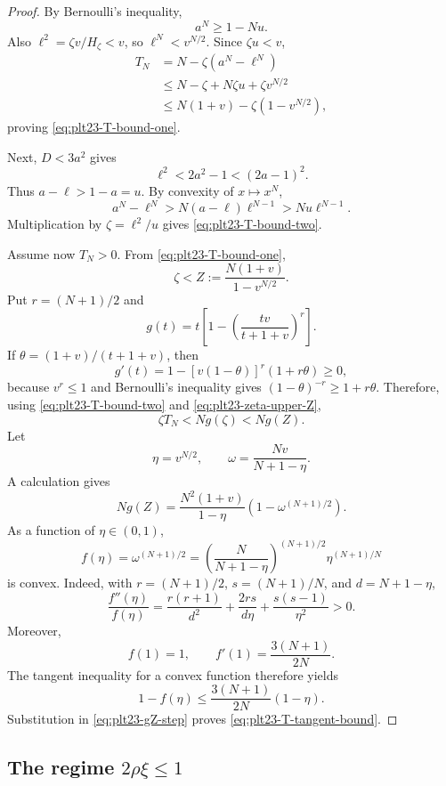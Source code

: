 \documentclass[11pt]{article}
\numberwithin{equation}{section}
\begin{document}
\begin{proof}
  By Bernoulli's inequality,
  \[
    a^N\ge1-Nu.
  \]
  Also $\ell^2=\zeta v/H_\zeta<v$, so $\ell^N<v^{N/2}$.
  Since $\zeta u< v$,
  \begin{align*}
    T_N
    &=N-\zeta(a^N-\ell^N)\\
    &\le N-\zeta+N\zeta u+\zeta v^{N/2}\\
    &\le N(1+v)-\zeta(1-v^{N/2}),
  \end{align*}
  proving \eqref{eq:plt23-T-bound-one}.

  Next, $D<3a^2$ gives
  \[
    \ell^2<2a^2-1<(2a-1)^2.
  \]
  Thus $a-\ell>1-a=u$.
  By convexity of $x\mapsto x^N$,
  \[
    a^N-\ell^N>N(a-\ell)\ell^{N-1}>Nu\ell^{N-1}.
  \]
  Multiplication by $\zeta=\ell^2/u$ gives \eqref{eq:plt23-T-bound-two}.

  Assume now $T_N>0$.
  From \eqref{eq:plt23-T-bound-one},
  \begin{equation}\label{eq:plt23-zeta-upper-Z}
    \zeta<Z:=\frac{N(1+v)}{1-v^{N/2}}.
  \end{equation}
  Put $r=(N+1)/2$ and
  \[
    g(t)=t\left[1-
    \left(\frac{tv}{t+1+v}\right)^r\right].
  \]
  If $\theta=(1+v)/(t+1+v)$, then
  \[
    g'(t)=1-[v(1-\theta)]^r(1+r\theta)\ge0,
  \]
  because $v^r\le1$ and Bernoulli's inequality gives $(1-\theta)^{-r}\ge1+r\theta$.
  Therefore, using \eqref{eq:plt23-T-bound-two} and \eqref{eq:plt23-zeta-upper-Z},
  \begin{equation}\label{eq:plt23-gZ-step}
    \zeta T_N<N g(\zeta)<Ng(Z).
  \end{equation}
  Let
  \[
    \eta=v^{N/2},
    \qquad
    \omega=\frac{Nv}{N+1-\eta}.
  \]
  A calculation gives
  \[
    Ng(Z)=
    \frac{N^2(1+v)}{1-\eta}
    \left(1-\omega^{(N+1)/2}\right).
  \]
  As a function of $\eta\in(0,1)$,
  \[
    f(\eta)=\omega^{(N+1)/2}
    =\left(\frac{N}{N+1-\eta}\right)^{(N+1)/2}
    \eta^{(N+1)/N}
  \]
  is convex.
  Indeed, with $r=(N+1)/2$, $s=(N+1)/N$, and $d=N+1-\eta$,
  \[
    \frac{f''(\eta)}{f(\eta)}
    =\frac{r(r+1)}{d^2}
    +\frac{2rs}{d\eta}
    +\frac{s(s-1)}{\eta^2}>0.
  \]
  Moreover,
  \[
    f(1)=1,
    \qquad
    f'(1)=\frac{3(N+1)}{2N}.
  \]
  The tangent inequality for a convex function therefore yields
  \[
    1-f(\eta)
    \le\frac{3(N+1)}{2N}(1-\eta).
  \]
  Substitution in \eqref{eq:plt23-gZ-step} proves \eqref{eq:plt23-T-tangent-bound}.
\end{proof}

\subsection{The regime \texorpdfstring{$2\rho\xi\le1$}{2 rho xi <= 1}}\label{subsec:plt23-quadratic}
\end{document}
